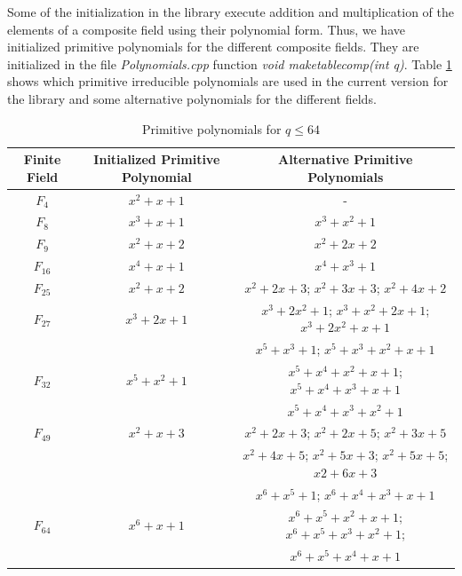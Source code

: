	Some of the initialization in the library execute addition and multiplication of the elements of a composite field using their polynomial form. Thus, we have initialized primitive polynomials for the different composite fields. They are initialized in the file \emph{Polynomials.cpp} function \emph{void maketablecomp(int q)}. Table \ref{polynomials} shows which primitive irreducible polynomials are used in the current version for the library and some alternative polynomials for the different fields. \\
		\begin{table}
		\caption{Primitive polynomials for $q \leq 64$}
		\label{polynomials}
		\begin{center}
			\begin{tabular}{|c|c|c|}
				\hline
				Finite Field & Initialized Primitive Polynomial   &  Alternative  Primitive Polynomials\\
				\hline
				\hline
				$F_4$ & $x^2 + x + 1$ & -\\
				\hline
				$F_8$ & $x^3+x+1$& $x^3+x^2+1$\\
				\hline
				$F_9$ & $x^2+x+2$ & $x^2+2x+2$ \\
				\hline
				$F_{16}$ & $x^4+x+1$ & $x^4 + x^3 +1$ \\	
				\hline
				$F_{25}$ & $x^2+x+2$ & $x^2+2x+3$; $x^2+3x+3$; $x^2+4x+2$\\
				\hline
				$F_{27}$ & $x^3+2x+1$ & $x^3 + 2x^2 +1$; $x^3+x^2+2x+1$; $x^3+2x^2+x+1$\\
				\hline
				 &  & $x^5+x^3+1$; $x^5 + x^3 + x^2+x+1$\\
				$F_{32}$ & $x^5+x^2+1$ & $x^5 + x^4 + x^2 +x+1$; $x^5 + x^4 + x^3 +x+1$ \\
				& &$x^5 + x^4 + x^3 +x^2 +1$\\
				\hline
				$F_{49}$ & $x^2+x+3$ & $x^2+2x+3$; $x^2+2x+5$; $x^2+3x+5$ \\
				& & $x^2+4x+5$; $x^2+5x+3$; $x^2+5x+5$; $x2+6x+3$\\
				\hline
				 &  & $x^6+x^5+1$; $x^6+x^4+x^3+x+1$ \\
				$F_{64}$& $x^6+x+1$ & $x^6+x^5+x^2+x+1$; $x^6+x^5+x^3+x^2+1$;\\
				& & $x^6+x^5+x^4+x+1$\\
				\hline
			\end{tabular}
		\end{center}
	\end{table}
